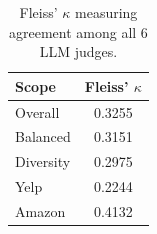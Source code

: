 \begin{table}[htbp]
\centering
\caption{Fleiss' $\kappa$ measuring agreement among all 6 LLM judges.}
\label{tab:fleiss}
\begin{tabular}{lc}
\hline
Scope & Fleiss' $\kappa$ \\
\hline
Overall & 0.3255 \\
Balanced & 0.3151 \\
Diversity & 0.2975 \\
Yelp & 0.2244 \\
Amazon & 0.4132 \\
\hline
\end{tabular}
\end{table}
